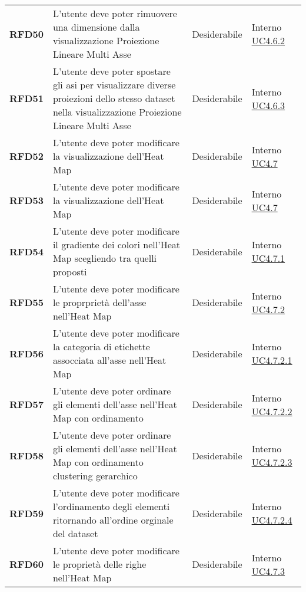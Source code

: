 \begin{longtable}[H]{>{\centering\bfseries}m{2cm} >{\centering}m{9cm} >{\centering}m{2.5cm} >{\centering\arraybackslash}m{2.5cm}}
    RFD50
    & L'utente deve poter rimuovere una dimensione dalla visualizzazione Proiezione Lineare Multi Asse
    & Desiderabile
    & Interno  \hyperref[par:uc4.6.2]{UC4.6.2} \\

    RFD51
    & L'utente deve poter spostare gli asi per visualizzare diverse proiezioni dello stesso dataset nella visualizzazione Proiezione Lineare Multi Asse
    & Desiderabile
    & Interno  \hyperref[par:uc4.6.3]{UC4.6.3} \\

    RFD52
    & L'utente deve poter modificare la visualizzazione dell'Heat Map
    & Desiderabile
    & Interno  \hyperref[ssub:uc4.7]{UC4.7} \\

    RFD53
    & L'utente deve poter modificare la visualizzazione dell'Heat Map
    & Desiderabile
    & Interno  \hyperref[ssub:uc4.7]{UC4.7} \\

    RFD54
    & L'utente deve poter modificare il gradiente dei colori nell'Heat Map scegliendo tra quelli proposti
    & Desiderabile
    & Interno  \hyperref[par:uc4.7.1]{UC4.7.1} \\

    RFD55
    & L'utente deve poter modificare le proprprietà dell'asse nell'Heat Map
    & Desiderabile
    & Interno  \hyperref[par:uc4.7.2]{UC4.7.2} \\

    RFD56
    & L'utente deve poter modificare la categoria di etichette assocciata all'asse nell'Heat Map
    & Desiderabile
    & Interno  \hyperref[spar:uc4.7.2.1]{UC4.7.2.1} \\

    RFD57
    & L'utente deve poter ordinare gli elementi dell'asse nell'Heat Map con ordinamento
    & Desiderabile
    & Interno  \hyperref[spar:uc4.7.2.2]{UC4.7.2.2} \\

    RFD58
    & L'utente deve poter ordinare gli elementi dell'asse nell'Heat Map con ordinamento clustering gerarchico
    & Desiderabile
    & Interno  \hyperref[spar:uc4.7.2.3]{UC4.7.2.3} \\

    RFD59
    & L'utente deve poter modificare l'ordinamento degli elementi ritornando all'ordine orginale del dataset
    & Desiderabile
    & Interno  \hyperref[spar:uc4.7.2.4]{UC4.7.2.4} \\

    RFD60
    & L'utente deve poter modificare le proprietà delle righe nell'Heat Map
    & Desiderabile
    & Interno  \hyperref[par:uc4.7.3]{UC4.7.3} \\


\end{longtable}
